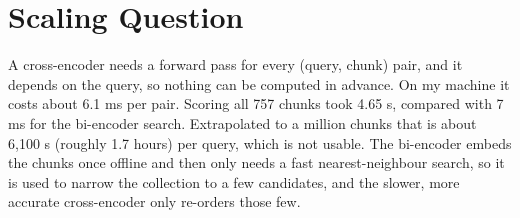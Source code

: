 \documentclass[11pt,a4paper]{article}
\begin{document}
\section{Scaling Question}
A cross-encoder needs a forward pass for every (query, chunk) pair, and it depends on the query, so nothing can be computed in advance. On my machine it costs about 6.1 ms per pair. Scoring all 757 chunks took 4.65 s, compared with 7 ms for the bi-encoder search. Extrapolated to a million chunks that is about 6{,}100 s (roughly 1.7 hours) per query, which is not usable. The bi-encoder embeds the chunks once offline and then only needs a fast nearest-neighbour search, so it is used to narrow the collection to a few candidates, and the slower, more accurate cross-encoder only re-orders those few.
\end{document}
